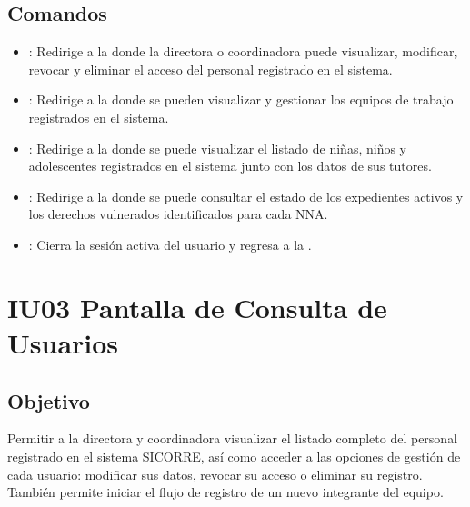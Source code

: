 \subsection{Comandos}
\begin{itemize}
	\item {}: Redirige a la 
	 donde la directora 
	o coordinadora puede visualizar, modificar, revocar y eliminar 
	el acceso del personal registrado en el sistema.
	
	\item {}: Redirige a la 
	donde se pueden visualizar y gestionar los equipos de trabajo 
	registrados en el sistema.
	
	\item {}: Redirige a la 
	 donde se 
	puede visualizar el listado de niñas, niños y adolescentes 
	registrados en el sistema junto con los datos de sus tutores.
	
	\item {}: Redirige a la 
	 donde se 
	puede consultar el estado de los expedientes activos y los 
	derechos vulnerados identificados para cada NNA.
	
	\item {}: Cierra la sesión activa del 
	usuario y regresa a la .
\end{itemize}


\section{IU03 Pantalla de Consulta de Usuarios}

\subsection{Objetivo}
Permitir a la directora y coordinadora visualizar el listado completo 
del personal registrado en el sistema SICORRE, así como acceder a las 
opciones de gestión de cada usuario: modificar sus datos, revocar su 
acceso o eliminar su registro. También permite iniciar el flujo de 
registro de un nuevo integrante del equipo.

